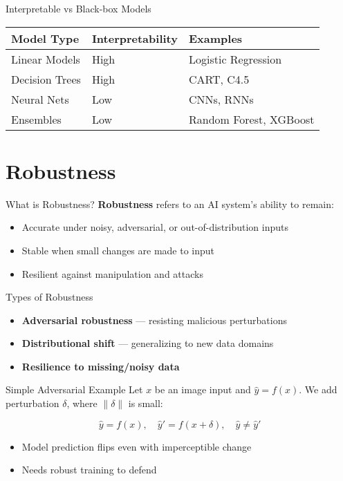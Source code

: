 \documentclass{beamer}
\begin{document}
\begin{frame}{Interpretable vs Black-box Models}
\footnotesize
\begin{tabular}{@{}lll@{}}
\toprule
\textbf{Model Type} & \textbf{Interpretability} & \textbf{Examples} \\
\midrule
Linear Models & High & Logistic Regression \\
Decision Trees & High & CART, C4.5 \\
Neural Nets & Low & CNNs, RNNs \\
Ensembles & Low & Random Forest, XGBoost \\
\bottomrule
\end{tabular}
\end{frame}

\section{Robustness}
\begin{frame}{What is Robustness?}
\textbf{Robustness} refers to an AI system's ability to remain:
\begin{itemize}
    \item Accurate under noisy, adversarial, or out-of-distribution inputs
    \item Stable when small changes are made to input
    \item Resilient against manipulation and attacks
\end{itemize}
\end{frame}

\begin{frame}{Types of Robustness}
\begin{itemize}
    \item \textbf{Adversarial robustness} — resisting malicious perturbations
    \item \textbf{Distributional shift} — generalizing to new data domains
    \item \textbf{Resilience to missing/noisy data}
\end{itemize}
\end{frame}

\begin{frame}{Simple Adversarial Example}
Let \( x \) be an image input and \( \hat{y} = f(x) \).  
We add perturbation \( \delta \), where \( \|\delta\| \) is small:

\[
\hat{y} = f(x), \quad \hat{y}' = f(x + \delta), \quad \hat{y} \ne \hat{y}'
\]

\begin{itemize}
    \item Model prediction flips even with imperceptible change
    \item Needs robust training to defend
\end{itemize}
\end{frame}
\end{document}
